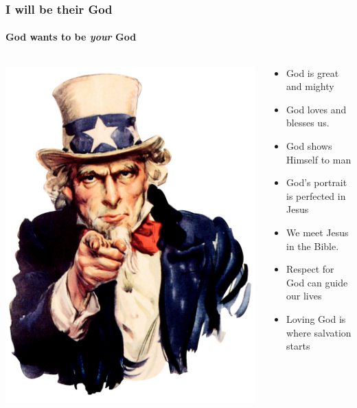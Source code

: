 \begin{frame}
\frametitle{I will be their God}
\framesubtitle{God wants to be \emph{your} God}
\begin{columns}[c]
\begin{column}{0.3\textwidth}
	\includegraphics[width=\columnwidth]{figures/uncleSam.jpg}
\end{column}
\begin{column}{0.7\textwidth}
	\begin{itemize}
		\item God is great and mighty
		\item God loves and blesses us.
		\item God shows Himself to man
		\item God's portrait is perfected in Jesus
		\item We meet Jesus in the Bible.  
		\item Respect for God can guide our lives
		\item Loving God is where salvation starts
	\end{itemize}
\end{column}
\end{columns}
\end{frame}